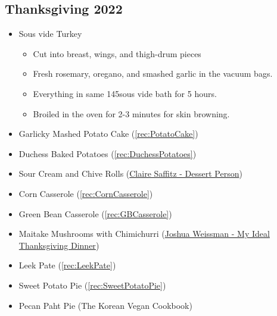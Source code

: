 \subsection*{Thanksgiving 2022}
\begin{itemize}        
	\item Sous vide Turkey
		\begin{itemize}        
			\item Cut into breast, wings, and thigh-drum pieces
			\item Fresh rosemary, oregano, and smashed garlic in the vacuum bags.
			\item Everything in same 145\faren sous vide bath for 5 hours.
			\item Broiled in the oven for 2-3 minutes for skin browning.
		\end{itemize}        
	\item Garlicky Mashed Potato Cake (\ref{rec:PotatoCake})
	\item Duchess Baked Potatoes (\ref{rec:DuchessPotatoes})
	\item Sour Cream and Chive Rolls (\href{https://www.youtube.com/watch?v=Wvk135WOAg0}{Claire Saffitz - Dessert Person})
	\item Corn Casserole (\ref{rec:CornCasserole})
	\item Green Bean Casserole (\ref{rec:GBCasserole})
	\item Maitake Mushrooms with Chimichurri (\href{https://youtu.be/Ke_MbvmDP0g?t=679}{Joshua Weissman - My Ideal Thanksgiving Dinner})
	\item Leek Pate (\ref{rec:LeekPate})
	\item Sweet Potato Pie (\ref{rec:SweetPotatoPie})
	\item Pecan Paht Pie (The Korean Vegan Cookbook)
\end{itemize}        
